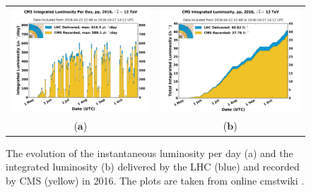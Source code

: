 \begin{figure}[htp]
\centering
\begin{tabular}{cc}
\hspace{-0.3cm}
\includegraphics[scale=0.39]{fig/chapt3/int_lumi_per_day_pp_2016.png}
& \hspace{-0.5cm} \includegraphics[scale=0.39]{fig/chapt3/int_lumi_per_day_cumulative_pp_2016.png}\\
   ($\mathbf{a}$)\qquad&($\mathbf{b}$)\qquad\\
\end{tabular}
\caption{The evolution of the instantaneous luminosity per day (a) and the integrated luminosity (b) delivered by the LHC (blue) and recorded by CMS (yellow) in 2016. The plots are taken from online cmstwiki \cite{twiki:cms_lumi}.}\label{fig:cms_lumi}
\end{figure}

